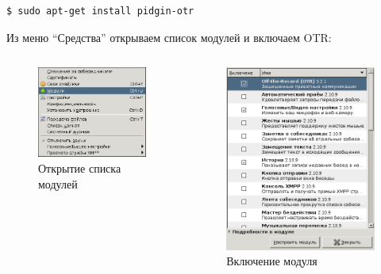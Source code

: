 \documentclass[presentation]{beamer}
\begin{document}
\begin{frame}[fragile]{}
\begin{verbatim}
$ sudo apt-get install pidgin-otr
\end{verbatim}
Из меню ``Средства'' открываем список модулей и включаем OTR:
\begin{columns}
  \begin{column}{0.5\textwidth}
    \begin{figure}[htb]
      \centering
      \includegraphics[clip,width=0.5\textheight]{pidgin-otr-1}
      \caption{Открытие списка модулей}
    \end{figure}
  \end{column}
  \begin{column}{0.5\textwidth}
    \label{sec-3-10-2}

    \begin{figure}[htb]
      \centering
      \includegraphics[clip,height=0.5\textheight]{./pidgin-otr-2}
      \caption{Включение модуля}
    \end{figure}
  \end{column}
\end{columns}
\end{frame}
\end{document}
